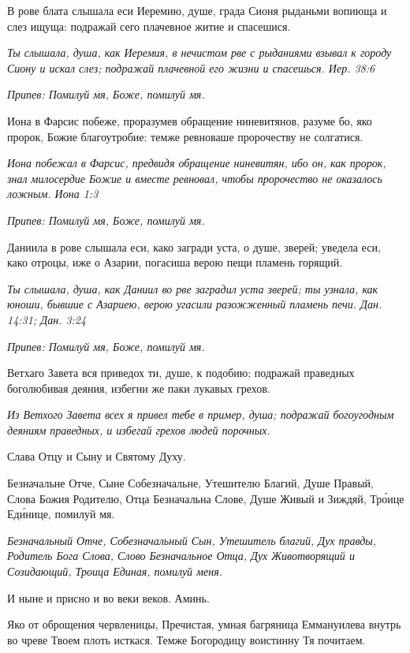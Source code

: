 В рове блата слышала еси Иеремию, душе, града Сионя рыданьми вопиюща и слез ищуща: подражай сего плачевное житие и спасешися.


\itshape Ты слышала, душа, как Иеремия, в нечистом рве с рыданиями взывал к городу Сиону и искал слез; подражай плачевной его жизни и спасешься. Иер. 38:6\normalfont{}


\itshape Припев:\normalfont{} Помилуй мя, Боже, помилуй мя.


Иона в Фарсис побеже, проразумев обращение ниневитянов, разуме бо, яко пророк, Божие благоутробие: темже ревноваше пророчеству не солгатися.


\itshape Иона побежал в Фарсис, предвидя обращение ниневитян, ибо он, как пророк, знал милосердие Божие и вместе ревновал, чтобы пророчество не оказалось ложным. Иона 1:3\normalfont{}


\itshape Припев:\normalfont{} Помилуй мя, Боже, помилуй мя.


Даниила в рове слышала еси, како загради уста, о душе, зверей; уведела еси, како отроцы, иже о Азарии, погасиша верою пещи пламень горящий.


\itshape Ты слышала, душа, как Даниил во рве заградил уста зверей; ты узнала, как юноши, бывшие с Азариею, верою угасили разожженный пламень печи. Дан. 14:31; Дан. 3:24\normalfont{}


\itshape Припев:\normalfont{} Помилуй мя, Боже, помилуй мя.


Ветхаго Завета вся приведох ти, душе, к подобию; подражай праведных боголюбивая деяния, избегни же паки лукавых грехов.


\itshape Из Ветхого Завета всех я привел тебе в пример, душа; подражай богоугодным деяниям праведных, и избегай грехов людей порочных.\normalfont{}


Слава Отцу и Сыну и Святому Духу.


Безначальне Отче, Сыне Собезначальне, Утешителю Благий, Душе Правый, Слова Божия Родителю, Отца Безначальна Слове, Душе Живый и Зиждяй, Тро́ице Еди́нице, помилуй мя.


\itshape Безначальный Отче, Собезначальный Сын, Утешитель благий, Дух правды, Родитель Бога Слова, Слово Безначальное Отца, Дух Животворящий и Созидающий, Троица Единая, помилуй меня.\normalfont{}


И ныне и присно и во веки веков. Аминь.


Яко от оброщения червленицы, Пречистая, умная багряница Еммануилева внутрь во чреве Твоем плоть исткася. Темже Богородицу воистинну Тя почитаем.


